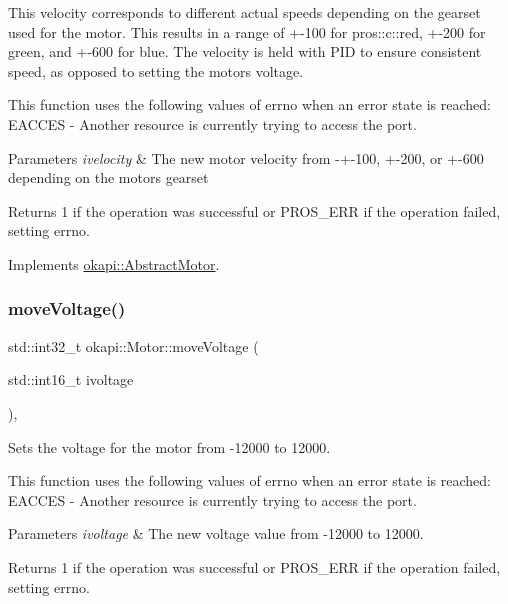 This velocity corresponds to different actual speeds depending on the gearset used for the motor. This results in a range of +-\/100 for pros\+::c\+::red, +-\/200 for green, and +-\/600 for blue. The velocity is held with P\+ID to ensure consistent speed, as opposed to setting the motor\textquotesingle{}s voltage.

This function uses the following values of errno when an error state is reached\+: E\+A\+C\+C\+ES -\/ Another resource is currently trying to access the port.


\begin{DoxyParams}{Parameters}
{\em ivelocity} & The new motor velocity from -\/+-\/100, +-\/200, or +-\/600 depending on the motor\textquotesingle{}s gearset \\
\hline
\end{DoxyParams}
\begin{DoxyReturn}{Returns}
1 if the operation was successful or P\+R\+O\+S\+\_\+\+E\+RR if the operation failed, setting errno. 
\end{DoxyReturn}


Implements \mbox{\hyperlink{classokapi_1_1AbstractMotor_a3170268f8d06f728327dcda08505e02b}{okapi\+::\+Abstract\+Motor}}.

\mbox{\label{classokapi_1_1Motor_a64b53a041c90c7b7a3903c607a9b17eb}} 
\subsubsection{\texorpdfstring{moveVoltage()}{moveVoltage()}}
{\footnotesize\ttfamily std\+::int32\+\_\+t okapi\+::\+Motor\+::move\+Voltage (\begin{DoxyParamCaption}\item[{std\+::int16\+\_\+t}]{ivoltage }\end{DoxyParamCaption})\hspace{0.3cm}{\ttfamily [override]}, {\ttfamily [virtual]}}

Sets the voltage for the motor from -\/12000 to 12000.

This function uses the following values of errno when an error state is reached\+: E\+A\+C\+C\+ES -\/ Another resource is currently trying to access the port.


\begin{DoxyParams}{Parameters}
{\em ivoltage} & The new voltage value from -\/12000 to 12000. \\
\hline
\end{DoxyParams}
\begin{DoxyReturn}{Returns}
1 if the operation was successful or P\+R\+O\+S\+\_\+\+E\+RR if the operation failed, setting errno. 
\end{DoxyReturn}


